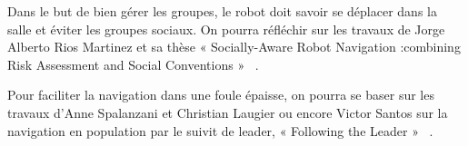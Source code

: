 Dans le but de bien gérer les groupes, le robot doit savoir se déplacer dans la salle et éviter les groupes sociaux. On pourra réfléchir sur les travaux de Jorge Alberto Rios Martinez et sa thèse « Socially-Aware Robot Navigation :combining Risk Assessment and Social Conventions » ~\cite{Martinez200601}.

Pour faciliter la navigation dans une foule épaisse, on pourra se baser sur les travaux d’Anne Spalanzani et Christian Laugier ou encore Victor Santos sur la navigation en population par le suivit de leader, « Following the Leader » ~\cite{followLeader}.


